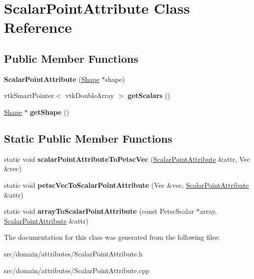 \hypertarget{class_scalar_point_attribute}{}\section{Scalar\+Point\+Attribute Class Reference}
\label{class_scalar_point_attribute}
\subsection*{Public Member Functions}
\begin{DoxyCompactItemize}
\item 
\hypertarget{class_scalar_point_attribute_aabaf966fe5de34576710f3e3af9b293c}{}{\bfseries Scalar\+Point\+Attribute} (\hyperlink{class_shape}{Shape} $\ast$shape)\label{class_scalar_point_attribute_aabaf966fe5de34576710f3e3af9b293c}

\item 
\hypertarget{class_scalar_point_attribute_a50ffe08ff4da2d775f5e0ed1ddcec9d4}{}vtk\+Smart\+Pointer$<$ vtk\+Double\+Array $>$ {\bfseries get\+Scalars} ()\label{class_scalar_point_attribute_a50ffe08ff4da2d775f5e0ed1ddcec9d4}

\item 
\hypertarget{class_scalar_point_attribute_aefadf25ab811fd43ad82de27563e0bcc}{}\hyperlink{class_shape}{Shape} $\ast$ {\bfseries get\+Shape} ()\label{class_scalar_point_attribute_aefadf25ab811fd43ad82de27563e0bcc}

\end{DoxyCompactItemize}
\subsection*{Static Public Member Functions}
\begin{DoxyCompactItemize}
\item 
\hypertarget{class_scalar_point_attribute_a868604d934009c0c827fe6dc80bde32f}{}static void {\bfseries scalar\+Point\+Attribute\+To\+Petsc\+Vec} (\hyperlink{class_scalar_point_attribute}{Scalar\+Point\+Attribute} \&attr, Vec \&vec)\label{class_scalar_point_attribute_a868604d934009c0c827fe6dc80bde32f}

\item 
\hypertarget{class_scalar_point_attribute_aac5d5ff1bff511f48e4f3b9c0445439e}{}static void {\bfseries petsc\+Vec\+To\+Scalar\+Point\+Attribute} (Vec \&vec, \hyperlink{class_scalar_point_attribute}{Scalar\+Point\+Attribute} \&attr)\label{class_scalar_point_attribute_aac5d5ff1bff511f48e4f3b9c0445439e}

\item 
\hypertarget{class_scalar_point_attribute_a9145f6719149dae88f177ef927d7ebfd}{}static void {\bfseries array\+To\+Scalar\+Point\+Attribute} (const Petsc\+Scalar $\ast$array, \hyperlink{class_scalar_point_attribute}{Scalar\+Point\+Attribute} \&attr)\label{class_scalar_point_attribute_a9145f6719149dae88f177ef927d7ebfd}

\end{DoxyCompactItemize}


The documentation for this class was generated from the following files\+:\begin{DoxyCompactItemize}
\item 
src/domain/attributes/Scalar\+Point\+Attribute.\+h\item 
src/domain/attributes/Scalar\+Point\+Attribute.\+cpp\end{DoxyCompactItemize}
